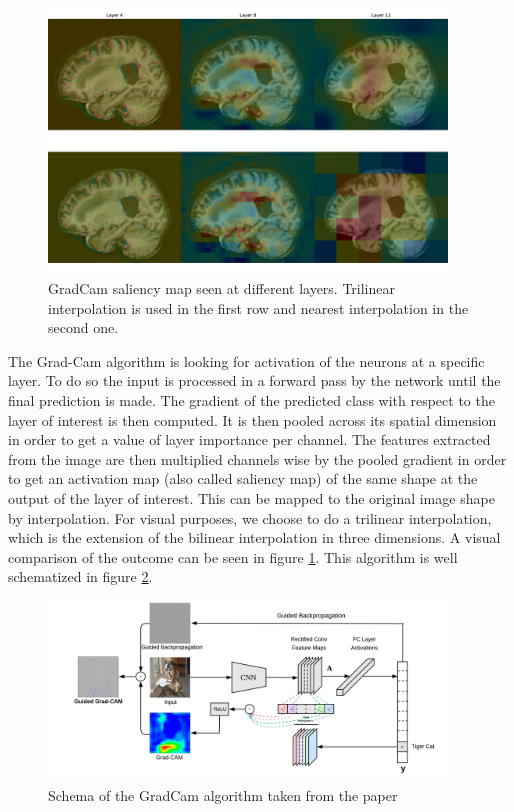 \begin{figure}
    \centering
    \includegraphics[width=400]{figures/gradcam_multilayer.pdf}
    \caption{GradCam saliency map seen at different layers. Trilinear interpolation is used in the first row and nearest interpolation in the second one.}
    \label{fig:grad_cam_multilayer}
\end{figure}

The Grad-Cam\cite{grad_cam_2019} algorithm is looking for activation of the neurons at a specific layer. To do so the input is processed in a forward pass by the network until the final prediction is made. The gradient of the predicted class with respect to the layer of interest is then computed. It is then pooled across its spatial dimension in order to get a value of layer importance per channel. The features extracted from the image are then multiplied channels wise by the pooled gradient in order to get an activation map (also called saliency map) of the same shape at the output of the layer of interest. This can be mapped to the original image shape by interpolation. For visual purposes, we choose to do a trilinear interpolation, which is the extension of the bilinear interpolation in three dimensions. A visual comparison of the outcome can be seen in figure \ref{fig:grad_cam_multilayer}. This algorithm is well schematized in figure \ref{fig:grad_cam_arch}.

\begin{figure}
    \centering
    \includegraphics[width=400]{figures/grad_cam_arch.jpeg}
    \caption{Schema of the GradCam algorithm taken from the paper\cite{grad_cam_2019}}
    \label{fig:grad_cam_arch}
\end{figure}

